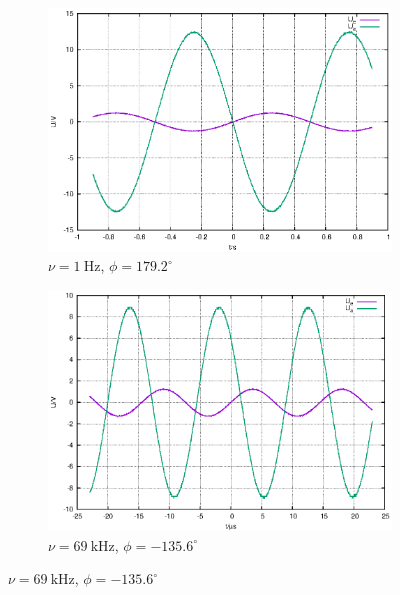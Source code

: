 \documentclass[10pt,a4paper]{scrartcl}
\begin{document}
\begin{figure}[!ht]
    \centering
    \begin{subfigure}[t]{0.6\textwidth}
        \centering
        \includegraphics[width=\textwidth]{graphics/plot_invVers_u.eps}
        \caption{$\nu=1~\mathrm{Hz}$, $\phi=179.2^\circ$}
    \end{subfigure}

    \begin{subfigure}[t]{0.6\textwidth}
        \centering
        \includegraphics[width=\textwidth]{graphics/plot_invVers_g.eps}
        \caption{$\nu=69~\mathrm{kHz}$, $\phi=-135.6^\circ$}
    \end{subfigure}


\end{figure}
\end{document}
